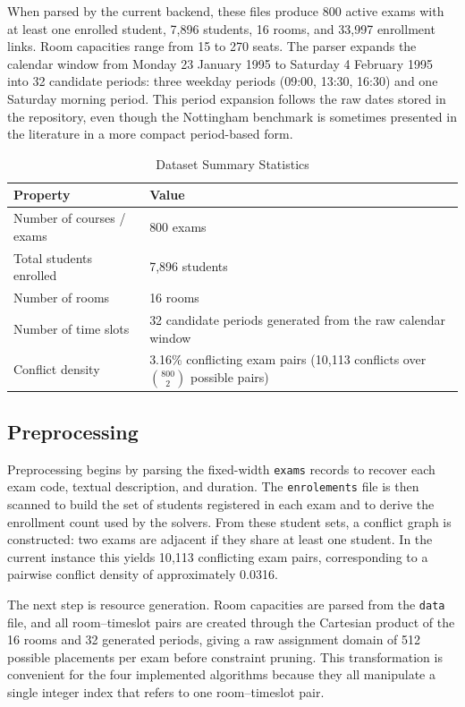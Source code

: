 When parsed by the current backend, these files produce 800 active exams
with at least one enrolled student, 7{,}896 students, 16 rooms, and
33{,}997 enrollment links. Room capacities range from 15 to 270 seats.
The parser expands the calendar window from Monday 23 January 1995 to
Saturday 4 February 1995 into 32 candidate periods: three weekday
periods (09:00, 13:30, 16:30) and one Saturday morning period. This
period expansion follows the raw dates stored in the repository, even
though the Nottingham benchmark is sometimes presented in the literature
in a more compact period-based form.

\begin{table}[H]
  \centering
  \caption{Dataset Summary Statistics}
  \label{tab:dataset_stats}
  \begin{tabularx}{\linewidth}{lX}
    \toprule
    \textbf{Property}          & \textbf{Value} \\
    \midrule
    Number of courses / exams  & 800 exams \\
    Total students enrolled    & 7{,}896 students \\
    Number of rooms            & 16 rooms \\
    Number of time slots       & 32 candidate periods generated from the raw calendar window \\
    Conflict density           & 3.16\% conflicting exam pairs (10{,}113 conflicts over $\binom{800}{2}$ possible pairs) \\
    \bottomrule
  \end{tabularx}
\end{table}

\subsection{Preprocessing}

Preprocessing begins by parsing the fixed-width \texttt{exams} records
to recover each exam code, textual description, and duration. The
\texttt{enrolements} file is then scanned to build the set of students
registered in each exam and to derive the enrollment count used by the
solvers. From these student sets, a conflict graph is constructed: two
exams are adjacent if they share at least one student. In the current
instance this yields 10{,}113 conflicting exam pairs, corresponding to a
pairwise conflict density of approximately 0.0316.

The next step is resource generation. Room capacities are parsed from
the \texttt{data} file, and all room--timeslot pairs are created through
the Cartesian product of the 16 rooms and 32 generated periods, giving a
raw assignment domain of 512 possible placements per exam before
constraint pruning. This transformation is convenient for the four
implemented algorithms because they all manipulate a single integer
index that refers to one room--timeslot pair.

